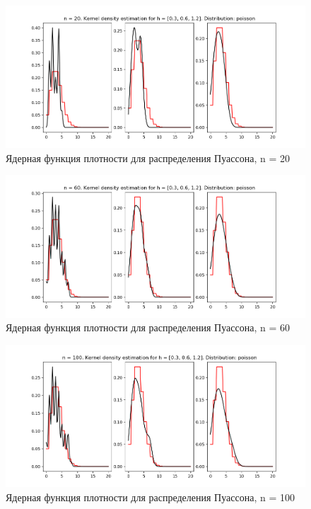 \documentclass[a4]{article}
\begin{document}
\begin{center}
    \begin{figure}[H]
 \caption{Ядерная функция плотности для распределения Пуассона, n = 20}
\includegraphics[width=\textwidth]{d_poisson20.png}
\end{figure}
    \begin{figure}[H]
 \caption{Ядерная функция плотности для распределения Пуассона, n = 60}
\includegraphics[width=\textwidth]{d_poisson60.png}
\end{figure}
    \begin{figure}[H]
 \caption{Ядерная функция плотности для распределения Пуассона, n = 100}
\includegraphics[width=\textwidth]{d_poisson100.png}
\end{figure}


\end{center}
\end{document}
